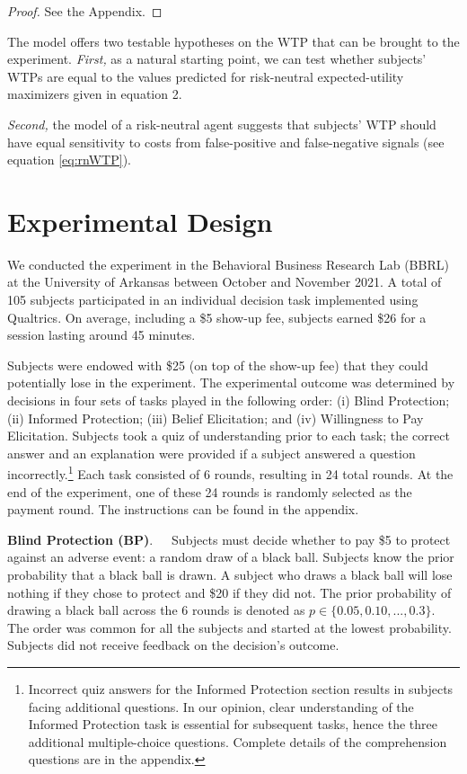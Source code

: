 \documentclass[12pt,a4paper]{article}
\begin{document}
\begin{proof}
See the Appendix.
\end{proof}

\noindent The model offers two testable hypotheses on the WTP that can be brought to the experiment. \emph{First,} as a natural starting point, we can test whether subjects' WTPs are equal to the values predicted for risk-neutral expected-utility maximizers given in equation 2. 

\emph{Second,} the model of a risk-neutral agent suggests that subjects' WTP should have equal sensitivity to costs from false-positive and false-negative signals (see equation \ref{eq:rnWTP}). 



\section{Experimental Design}\label{sec:design}

We conducted the experiment in the Behavioral Business Research Lab (BBRL) at the University of Arkansas between October and November 2021.  A total of 105 subjects participated in an individual decision task implemented using Qualtrics.  On average, including a \$5 show-up fee, subjects earned \$26 for a session lasting around 45 minutes. 
 
Subjects were endowed with \$25 (on top of the show-up fee) that they could potentially lose in the experiment. The experimental outcome was determined by decisions in four sets of tasks played in the following order: (i) Blind Protection; (ii) Informed Protection; (iii) Belief Elicitation; and (iv) Willingness to Pay Elicitation. Subjects took a quiz of understanding prior to each task; the correct answer and an explanation were provided if a subject answered a question incorrectly.\footnote{Incorrect quiz answers for the Informed Protection section results in subjects facing additional questions. In our opinion, clear understanding of the Informed Protection task is essential for subsequent tasks, hence the three additional multiple-choice questions. Complete details of the comprehension questions are in the appendix.} Each task consisted of 6 rounds, resulting in 24 total rounds. At the end of the experiment, one of these 24 rounds is randomly selected as the payment round. The instructions can be found in the appendix.


\bigskip
\noindent\textbf{Blind Protection (BP)}.\ \ \ Subjects must decide whether to pay \$5 to protect against an adverse event: a random draw of a black ball.  Subjects know the prior probability that a black ball is drawn. A subject who draws a black ball will lose nothing if they chose to protect and \$20 if they did not. The prior probability of drawing a black ball across the 6 rounds is denoted as $p \in \{0.05,0.10,...,0.3\}$. The order was common for all the subjects and started at the lowest probability. Subjects did not receive feedback on the decision's outcome.
\end{document}
